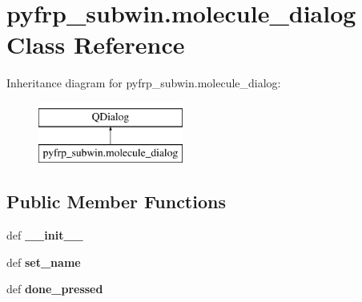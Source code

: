 \hypertarget{classpyfrp__subwin_1_1molecule__dialog}{\section{pyfrp\+\_\+subwin.\+molecule\+\_\+dialog Class Reference}
\label{classpyfrp__subwin_1_1molecule__dialog}
}
Inheritance diagram for pyfrp\+\_\+subwin.\+molecule\+\_\+dialog\+:\begin{figure}[H]
\begin{center}
\leavevmode
\includegraphics[height=2.000000cm]{classpyfrp__subwin_1_1molecule__dialog}
\end{center}
\end{figure}
\subsection*{Public Member Functions}
\begin{DoxyCompactItemize}
\item 
\hypertarget{classpyfrp__subwin_1_1molecule__dialog_a72d9e9547a32913ef0950df5c2599384}{def {\bfseries \+\_\+\+\_\+init\+\_\+\+\_\+}}\label{classpyfrp__subwin_1_1molecule__dialog_a72d9e9547a32913ef0950df5c2599384}

\item 
\hypertarget{classpyfrp__subwin_1_1molecule__dialog_aab296c6f7bbfc83df4e19d37e53ee49a}{def {\bfseries set\+\_\+name}}\label{classpyfrp__subwin_1_1molecule__dialog_aab296c6f7bbfc83df4e19d37e53ee49a}

\item 
\hypertarget{classpyfrp__subwin_1_1molecule__dialog_a97642425e3f16995acfa9b8ec834cc91}{def {\bfseries done\+\_\+pressed}}\label{classpyfrp__subwin_1_1molecule__dialog_a97642425e3f16995acfa9b8ec834cc91}

\end{DoxyCompactItemize}
